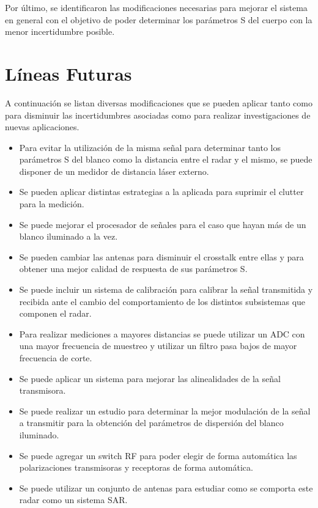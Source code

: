 Por último, se identificaron las modificaciones necesarias para mejorar el sistema en general con el objetivo de poder determinar los parámetros S del cuerpo con la menor incertidumbre posible.
\section{Líneas Futuras}

A continuación se listan diversas modificaciones que se pueden aplicar tanto como para disminuir las incertidumbres asociadas como para realizar investigaciones de nuevas aplicaciones.


\begin{itemize}
    \item Para evitar la utilización de la misma señal para determinar tanto los parámetros S del blanco como la distancia entre el radar y el mismo, se puede disponer de un medidor de distancia láser externo.
    \item Se pueden aplicar distintas estrategias a la aplicada para suprimir el clutter para la medición.
    \item Se puede mejorar el procesador de señales para el caso que hayan más de un blanco iluminado a la vez.
    \item Se pueden cambiar las antenas para disminuir el crosstalk entre ellas y para obtener una mejor calidad de respuesta de sus parámetros S.
    \item Se puede incluir un sistema de calibración para calibrar la señal transmitida y recibida ante el cambio del comportamiento de los distintos subsistemas que componen el radar.
    \item Para realizar mediciones a mayores distancias se puede utilizar un ADC con una mayor frecuencia de muestreo y utilizar un filtro pasa bajos de mayor frecuencia de corte.
    \item Se puede aplicar un sistema para mejorar las alinealidades de la señal transmisora.
    \item Se puede realizar un estudio para determinar la mejor modulación de la señal a transmitir para la obtención del parámetros de dispersión del blanco iluminado.
    \item Se puede agregar un switch RF para poder elegir de forma automática las polarizaciones transmisoras y receptoras de forma automática.
    \item Se puede utilizar un conjunto de antenas para estudiar como se comporta este radar como un sistema SAR.
\end{itemize}